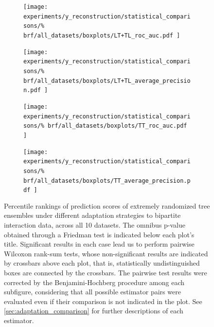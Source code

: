 
\begin{figure}[tbh]
    \centering
    \begin{subfigure}{0.49\textwidth}
        \texttt{[image: 
            experiments/y\_reconstruction/statistical\_comparisons/\%
            brf/all\_datasets/boxplots/LT+TL\_roc\_auc.pdf
        ]}
    \end{subfigure}
    \begin{subfigure}{0.49\textwidth}
        \texttt{[image: 
            experiments/y\_reconstruction/statistical\_comparisons/\%
            brf/all\_datasets/boxplots/LT+TL\_average\_precision.pdf
        ]}
    \end{subfigure}

    \begin{subfigure}{0.49\textwidth}
        \texttt{[image: 
            experiments/y\_reconstruction/statistical\_comparisons/\%
            brf/all\_datasets/boxplots/TT\_roc\_auc.pdf
        ]}
    \end{subfigure}
    \begin{subfigure}{0.49\textwidth}
        \texttt{[image: 
            experiments/y\_reconstruction/statistical\_comparisons/\%
            brf/all\_datasets/boxplots/TT\_average\_precision.pdf
        ]}
    \end{subfigure}
    \caption{
        Percentile rankings of prediction scores of extremely randomized tree ensembles under different adaptation strategies to bipartite interaction data, across all 10 datasets.
        The omnibus p-value obtained through a Friedman test is indicated below each plot's title. Significant results in each case lead us to perform pairwise Wilcoxon rank-sum tests, whose non-significant results are indicated by crossbars above each plot, that is, statistically undistinguished boxes are connected by the crossbars. The pairwise test results were corrected by the Benjamini-Hochberg procedure among each subfigure, considering that all possible estimator pairs were evaluated even if their comparison is not indicated in the plot. See \autoref{sec:adaptation_comparison} for further descriptions of each estimator.
    }
    \label{fig:brf_y_reconstruction}
\end{figure}


